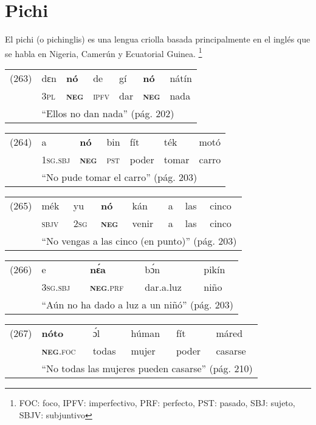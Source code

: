 \section*{Pichi}

\noindent El pichi (o pichinglis) es una lengua criolla basada principalmente en el inglés que se habla en Nigeria, Camerún y Ecuatorial Guinea.
\footnote{FOC: foco, IPFV: imperfectivo, PRF: perfecto, PST: pasado, SBJ: sujeto, SBJV: subjuntivo}
\vspace{0.5cm}

{\setmainfont{Charis SIL} 

\begin{tabular}{lllllll}
(263) & dɛn & \textbf{nó} & de & gí & \textbf{nó} & nátín \\
& \textsc{3pl} & \textsc{\textbf{neg}} & \textsc{ipfv} & dar & \textsc{\textbf{neg}} & nada \\
& \multicolumn{6}{l}{``Ellos no dan nada'' (pág. 202)}
\end{tabular} \vspace{0.5cm}

\begin{tabular}{lllllll}
(264) & a & \textbf{nó} & bin & fít & ték & motó \\
& \textsc{1sg.sbj} & \textsc{\textbf{neg}} & \textsc{pst} & poder & tomar & carro \\
& \multicolumn{6}{l}{``No pude tomar el carro'' (pág. 203)}
\end{tabular} \vspace{0.5cm}

\begin{tabular}{llllllll}
(265) & mék & yu & \textbf{nó} & kán & a & las & cinco \\
& \textsc{sbjv} & \textsc{2sg} & \textsc{\textbf{neg}} & venir & a & las & cinco \\
& \multicolumn{7}{l}{``No vengas a las cinco (en punto)'' (pág. 203)}
\end{tabular} \vspace{0.5cm}

\begin{tabular}{lllll}
(266) & e & \textbf{nɛ́a} & bɔ́n & pikín \\
& \textsc{3sg.sbj} & \textsc{\textbf{neg}.prf} & dar.a.luz & niño \\
& \multicolumn{4}{l}{``Aún no ha dado a luz a un niñó'' (pág. 203)}
\end{tabular} \vspace{0.5cm}

\begin{tabular}{llllll}
(267) & \textbf{nóto} & ɔ́l & húman & fít & máred \\
& \textsc{\textbf{neg}.foc} & todas & mujer & poder & casarse \\
& \multicolumn{5}{l}{``No todas las mujeres pueden casarse'' (pág. 210)}
\end{tabular} \vspace{0.5cm}

}

